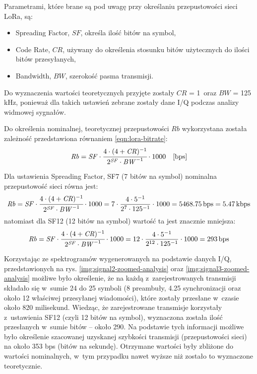 Parametrami, które brane są pod uwagę przy określaniu przepustowości sieci LoRa, są:
\begin{itemize}[label=--]
    \item Spreading Factor, $\mathit{SF}$, określa ilość bitów na symbol,
    \item Code Rate, $\mathit{CR}$, używany do określenia stosunku bitów użytecznych do ilości bitów przesyłanych,
    \item Bandwidth, $\mathit{BW}$, szerokość pasma transmisji.
\end{itemize}
Do wyznaczenia wartości teoretycznych przyjęte zostały $\mathit{CR}$ = 1~oraz $\mathit{BW}$ = 125 kHz, ponieważ dla
takich ustawień zebrane zostały dane I/Q podczas analizy widmowej sygnałów.

Do określenia nominalnej, teoretycznej przepustowości $\mathit{Rb}$ wykorzystana została zależność przedstawiona
równaniem \ref{eqn:lora-bitrate}:
\begin{equation}\label{eqn:lora-bitrate}
    \mathit{Rb} = \mathit{SF}\cdot\cfrac{4\cdot{(4+\mathit{CR})^{-1}}}{2^{\mathit{SF}}\cdot{\mathit{BW}^{-1}}}\cdot{1000}\quad\text{[bps]}
\end{equation}

Dla ustawienia Spreading Factor, SF7 (7 bitów na symbol) nominalna przepustowość sieci równa jest:
\begin{equation*}
    \mathit{Rb} = \mathit{SF}\cdot\cfrac{4\cdot{(4+\mathit{CR})^{-1}}}{2^{\mathit{SF}}\cdot{\mathit{BW}^{-1}}}\cdot{1000} = 7 \cdot \frac{4 \cdot 5^{-1}}{2^7\cdot 125^{-1}} \cdot 1000 = 5468.75\,\text{bps} = 5.47\,\text{kbps}
\end{equation*}
natomiast dla SF12 (12 bitów na symbol) wartość ta jest znacznie mniejsza:
\begin{equation*}
    \mathit{Rb} = \mathit{SF}\cdot\cfrac{4\cdot{(4+\mathit{CR})^{-1}}}{2^{\mathit{SF}}\cdot{\mathit{BW}^{-1}}}\cdot{1000} = 12 \cdot \frac{4 \cdot 5^{-1}}{2^{12}\cdot 125^{-1}} \cdot 1000 = 293\,\text{bps}
\end{equation*}

Korzystając ze spektrogramów wygenerowanych na podstawie danych I/Q, przedstawionych na rys.
\ref{img:signal2-zoomed-analysis} oraz \ref{img:signal3-zoomed-analysis} możliwe było określenie, że na każdą
z~zarejestrowanych transmisji składało się w~sumie 24 do 25 symboli (8 preambuły, 4.25 synchronizacji oraz około 12
właściwej przesyłanej wiadomości), które zostały przesłane w~czasie około 820 milisekund. Wiedząc, że zarejestrowane
transmisje korzystały z~ustawienia SF12 (czyli 12 bitów na symbol), wyznaczona została ilość przesłanych w~sumie bitów
-- około 290. Na podstawie tych informacji możliwe było określenie szacowanej uzyskanej szybkości transmisji
(przepustowości sieci) na około 353 bps (bitów na sekundę). Otrzymane wartości były zbliżone do wartości nominalnych,
w~tym przypadku nawet wyższe niż zostało to wyznaczone teoretycznie.

